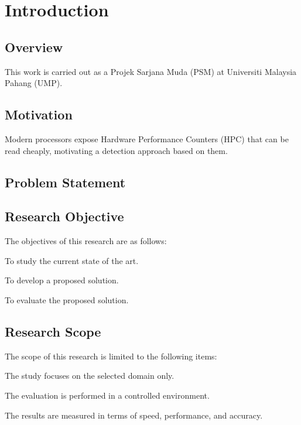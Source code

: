 \chapter{Introduction}\label{ch1:introduction}

\section{Overview}
\lipsum[1-2] \citep{dummy2020book,dummy2019article} This work is
carried out as a Projek Sarjana Muda (PSM) at Universiti Malaysia
Pahang (UMP).

\section{Motivation}
\lipsum[3] \citep{dummy2018proc} Modern processors expose Hardware
Performance Counters (HPC) that can be read cheaply, motivating a
detection approach based on them.

\section{Problem Statement}
\lipsum[4]

\section{Research Objective}
The objectives of this research are as follows:
\begin{enumlist}
    \item To study the current state of the art.
    \item To develop a proposed solution.
    \item To evaluate the proposed solution.
\end{enumlist}

\section{Research Scope}
The scope of this research is limited to the following items:
\begin{enumlist}
    \item The study focuses on the selected domain only.
    \item The evaluation is performed in a controlled environment.
    \item The results are measured in terms of speed, performance, and accuracy.
\end{enumlist}

